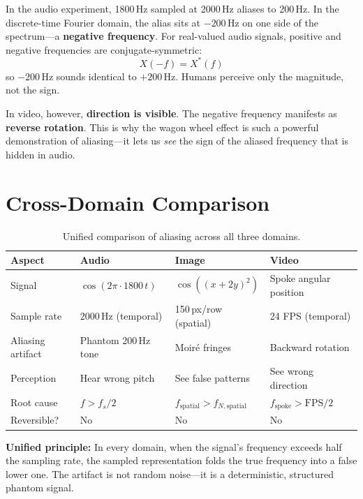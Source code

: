 \documentclass[12pt, a4paper]{article}
\begin{document}
In the audio experiment, 1800\,Hz sampled at 2000\,Hz aliases to 200\,Hz. In the discrete-time Fourier domain, the alias sits at $-200$\,Hz on one side of the spectrum---a \textbf{negative frequency}. For real-valued audio signals, positive and negative frequencies are conjugate-symmetric:
\begin{equation}
    X(-f) = X^*(f)
\end{equation}
so $-200$\,Hz sounds identical to $+200$\,Hz. Humans perceive only the magnitude, not the sign.

In video, however, \textbf{direction is visible}. The negative frequency manifests as \textbf{reverse rotation}. This is why the wagon wheel effect is such a powerful demonstration of aliasing---it lets us \emph{see} the sign of the aliased frequency that is hidden in audio.

\section{Cross-Domain Comparison}

\begin{table}[H]
\centering
\caption{Unified comparison of aliasing across all three domains.}
\label{tab:cross-domain}
\renewcommand{\arraystretch}{1.3}
\begin{tabular}{@{}p{2.8cm}p{3.5cm}p{3.5cm}p{3.5cm}@{}}
\toprule
\textbf{Aspect} & \textbf{Audio} & \textbf{Image} & \textbf{Video} \\
\midrule
Signal & $\cos(2\pi \cdot 1800\,t)$ & $\cos((x{+}2y)^2)$ & Spoke angular position \\
Sample rate & 2000\,Hz (temporal) & 150\,px/row (spatial) & 24 FPS (temporal) \\
Aliasing artifact & Phantom 200\,Hz tone & Moir\'{e} fringes & Backward rotation \\
Perception & Hear wrong pitch & See false patterns & See wrong direction \\
Root cause & $f > f_s/2$ & $f_{\text{spatial}} > f_{N,\text{spatial}}$ & $f_{\text{spoke}} > \text{FPS}/2$ \\
Reversible? & No & No & No \\
\bottomrule
\end{tabular}
\end{table}

\textbf{Unified principle:} In every domain, when the signal's frequency exceeds half the sampling rate, the sampled representation folds the true frequency into a false lower one. The artifact is not random noise---it is a deterministic, structured phantom signal.
\end{document}
